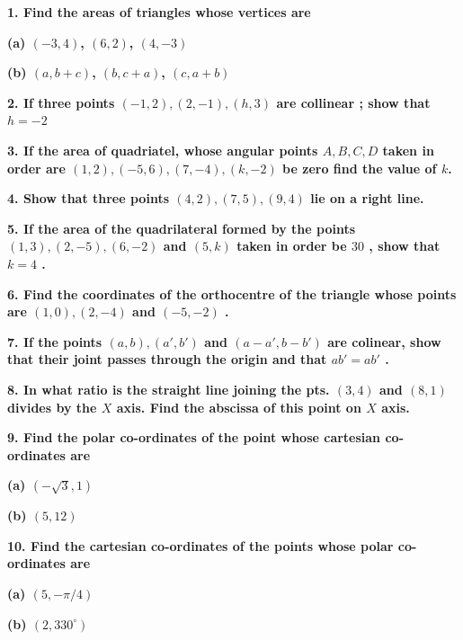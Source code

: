 \documentclass{article}
\begin{document}
\begin{flushleft}


\textbf{1. Find the areas of triangles whose vertices are}\par
\textbf{(a) $(-3, 4)$, $(6, 2)$, $(4, -3)$}\par
\textbf{(b) $(a, b+c)$, $(b, c+a)$, $(c, a+b)$}\par
\vspace{0.2cm}
\textbf{2. If three points $(-1, 2), (2, -1),(h,3)$ are collinear ; show that $h=-2$}\par
\vspace{0.2cm}
\textbf{3. If the area of quadriatel, whose angular points $A, B, C, D$ taken in order are $(1,2),(-5,6),(7,-4),(k,-2)$ be zero find the value of $k$.}\par
\vspace{0.2cm}
\textbf{4. Show that three points $(4,2),(7,5),(9,4)$ lie on a right line.}\par
\vspace{0.2cm}
\textbf{5. If the area of the quadrilateral formed by the points $(1,3),(2,-5),(6,-2)$ and $(5,k)$ taken in order be $30$ , show that $k=4$ . }\par
\vspace{0.2cm}
\textbf{6. Find the coordinates of the orthocentre of the triangle whose points are $(1,0),(2,-4)$ and $(-5,-2)$ .}\par
\vspace{0.2cm}
\textbf{7. If the points $(a,b),(a',b')$ and $(a-a' , b-b')$ are colinear, show that their joint passes through the origin and that $ab'=ab'$ .}\par
\vspace{0.2cm}
\textbf{8. In what ratio is the straight line joining the pts. $(3,4)$ and $(8,1)$ divides by the $X$ axis. Find the abscissa of this point on $X$ axis.}\par
\vspace{0.2cm}
\textbf{9. Find the polar co-ordinates of the point whose cartesian co-ordinates are}\par
\textbf{(a) $(-\sqrt{3},1)$  }\par
\textbf{(b) $(5,12)$}\par
\vspace{0.2cm}
\textbf{10. Find the cartesian co-ordinates of the points whose polar co-ordinates are}\par
\textbf{(a) $(5, -\pi/4)$}\par
\textbf{(b) $(2, 330^{\circ})$}\par

\end{flushleft}
\end{document}
